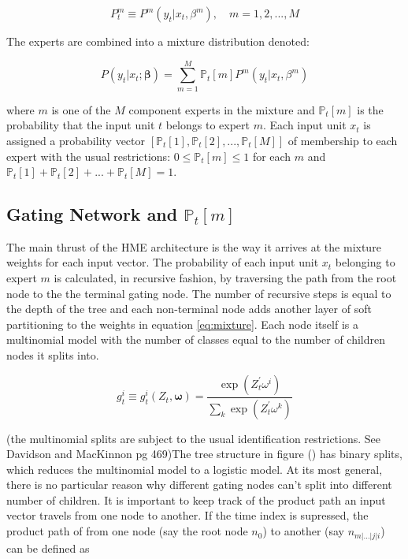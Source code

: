\documentclass[12pt]{article}
\begin{document}
\begin{equation} \label{eq:ConditionalDistribution}
  P^{m}_{t} \equiv P^{m}(y_{t}|x_{t},\beta^{m}), \quad m = 1,2,...,M
\end{equation}

The experts are combined into a mixture distribution denoted:

\begin{equation} \label{eq:mixture}
  P(y_{t}|x_{t};\boldsymbol{\beta}) = \sum_{m=1}^{M}\mathbb{P}_{t}[m]P^{m}(y_{t}|x_{t},\beta^{m})
\end{equation}

where $m$ is one of the $M$ component experts in the mixture and $\mathbb{P}_{t}[m]$ is the probability that the input unit $t$ belongs to expert $m$. Each input unit $x_{t}$ is assigned a probability vector $[\mathbb{P}_{t}[1], \mathbb{P}_{t}[2],...,\mathbb{P}_{t}[M]]$ of membership to each expert with the usual restrictions: $0 \leq \mathbb{P}_{t}[m] \leq 1$ for each $m$ and $\mathbb{P}_{t}[1] + \mathbb{P}_{t}[2] + ... + \mathbb{P}_{t}[M] = 1$.


\subsection{Gating Network and $\mathbb{P}_{t}[m]$}
The main thrust of the HME architecture is the way it arrives at the mixture weights for each input vector. The probability of each input unit $x_{t}$ belonging to expert $m$ is calculated, in recursive fashion, by traversing the path from the root node to the the terminal gating node. The number of recursive steps is equal to the depth of the tree and each non-terminal node adds another layer of soft partitioning to the weights in equation \ref{eq:mixture}. Each node itself is a multinomial model with the number of classes equal to the number of children nodes it splits into. 

\begin{equation} \label{eq:softmax}
  g^{i}_{t} \equiv g^{i}_{t}(Z_{t},\boldsymbol{\omega}) = \frac{\exp(Z_{t}^{\prime}\omega^{i})}{\sum_{k}{\exp(Z_{t}^{\prime}\omega^{k})}}
\end{equation}

(the multinomial splits are subject to the usual identification restrictions. See Davidson and MacKinnon pg 469)The tree structure in figure () has binary splits, which reduces the multinomial model to a logistic model. At its most general, there is no particular reason why different gating nodes can't split into different number of children. It is important to keep track of the product path an input vector travels from one node to another. If the time index is supressed, the product path of from one node (say the root node $n_{0}$) to another (say $n_{m|\ldots|j|i}$) can be defined as
\end{document}
